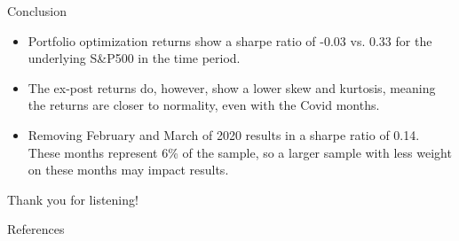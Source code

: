\documentclass[9pt]{beamer}
\begin{document}

\begin{frame}{Conclusion}
    \begin{itemize}
        \item Portfolio optimization returns show a sharpe ratio of -0.03 vs. 0.33 for the underlying S\&P500 in the time period.
        \item The ex-post returns do, however, show a lower skew and kurtosis, meaning the returns are closer to normality, even with the Covid months.
        \item Removing February and March of 2020 results in a sharpe ratio of 0.14. These months represent 6\% of the sample, so a larger sample with less weight on these months may impact results.
    \end{itemize}
\end{frame}

\begin{frame}
\begin{center}
\large{Thank you for listening!}
\end{center}
\end{frame}

\begin{frame}{References}
    
\end{frame}
\end{document}
